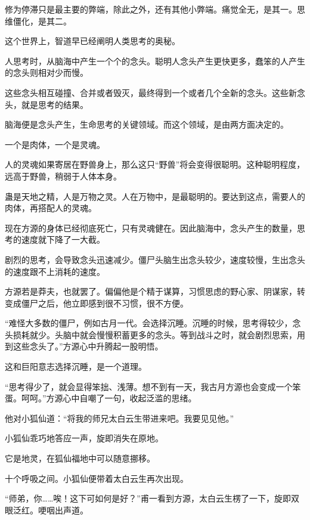 
\begin{this_body}



修为停滞只是最主要的弊端，除此之外，还有其他小弊端。痛觉全无，是其一。思维僵化，是其二。

这个世界上，智道早已经阐明人类思考的奥秘。

人思考时，从脑海中产生一个个的念头。聪明人念头产生更快更多，蠢笨的人产生的念头则相对少而慢。

这些念头相互碰撞、合并或者毁灭，最终得到一个或者几个全新的念头。这些新念头，就是思考的结果。

脑海便是念头产生，生命思考的关键领域。而这个领域，是由两方面决定的。

一个是肉体，一个是灵魂。

人的灵魂如果寄居在野兽身上，那么这只“野兽”将会变得很聪明。这种聪明程度，远高于野兽，稍弱于人体本身。

蛊是天地之精，人是万物之灵。人在万物中，是最聪明的。要达到这点，需要人的肉体，再搭配人的灵魂。

现在方源的身体已经彻底死亡，只有灵魂健在。因此脑海中，念头产生的数量，思考的速度就下降了一大截。

剧烈的思考，会导致念头迅速减少。僵尸头脑生出念头较少，速度较慢，生出念头的速度跟不上消耗的速度。

方源若是莽夫，也就罢了。偏偏他是个精于谋算，习惯思虑的野心家、阴谋家，转变成僵尸之后，他立即感到很不习惯，很不方便。

“难怪大多数的僵尸，例如古月一代。会选择沉睡。沉睡的时候，思考得较少，念头损耗就少。头脑中就会慢慢积蓄更多的念头。等到战斗之时，就会剧烈思索，用到这些念头了。”方源心中升腾起一股明悟。

这和巨阳意志选择沉睡，是一个道理。

“思考得少了，就会显得笨拙、浅薄。想不到有一天，我古月方源也会变成一个笨蛋。呵呵。”方源心中自嘲了一句，收起泛滥的思绪。

他对小狐仙道：“将我的师兄太白云生带进来吧。我要见见他。”

小狐仙乖巧地答应一声，旋即消失在原地。

它是地灵，在狐仙福地中可以随意挪移。

十个呼吸之间。小狐仙便带着太白云生再次出现。

“师弟，你……唉！这下可如何是好？”甫一看到方源，太白云生楞了一下，旋即双眼泛红。哽咽出声道。


\end{this_body}
